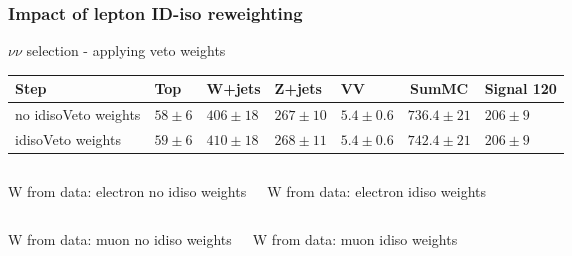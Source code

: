 \documentclass[red,compress,xcolor=table]{beamer}
\begin{document}
\begin{frame}
  \frametitle{Impact of lepton ID-iso reweighting}

\vspace*{-0.5cm}
\begin{block}{\scriptsize $\nu\nu$ selection - applying veto weights}
\begin{center}
    {\tiny
 \begin{tabular}{|l|p{}|p{}|p{}||p{}|c||p{}|}
\hline
Step & Top & W+jets & Z+jets & VV & SumMC & Signal 120 \\
\hline
no idisoVeto weights & $ 58 \pm 6 $ & $ 406 \pm 18 $ & $ 267 \pm 10 $ & $ 5.4 \pm 0.6 $ & $ 736.4 \pm  21$ & $ 206 \pm 9 $ \\ 
idisoVeto weights & $ 59 \pm 6 $ & $ 410 \pm 18 $ & $ 268 \pm 11 $ & $ 5.4 \pm 0.6 $ & $ 742.4 \pm 21 $ & $ 206 \pm 9 $ \\ 
\hline
\end{tabular}
    }
\end{center}
  \end{block}


\vspace*{-0.2cm}
\begin{columns}
  \begin{block}{\scriptsize W from data: electron no idiso weights}
    {\tiny
      
    }
  \end{block}
  \begin{block}{\scriptsize W from data: electron idiso weights }
    {\tiny
      
    }
  \end{block}
\end{columns}
\begin{columns}
  \begin{block}{\scriptsize W from data: muon  no idiso weights}
    {\tiny
      
    }
  \end{block}
  \begin{block}{\scriptsize W from data: muon idiso weights}
    {\tiny
      
    }
  \end{block}
\end{columns}


\end{frame}
\end{document}
